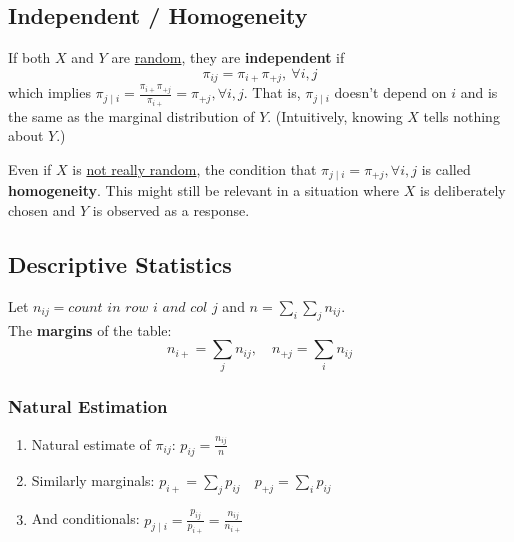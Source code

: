 \documentclass[11pt]{elegantbook}
\begin{document}
\subsection{Independent / Homogeneity}
\begin{definition}[independent]
    If both $X$ and $Y$ are \underline{random}, they are \textbf{independent} if $$\pi_{ij}=\pi_{i+}\pi_{+j},\ \forall i,j$$
    which implies $\pi_{j\mid i}=\frac{\pi_{i+}\pi_{+j}}{\pi_{i+}}=\pi_{+j},\forall i,j$. That is, $\pi_{j\mid i}$ doesn't depend on $i$ and is the same as the marginal distribution of $Y$. (Intuitively, knowing $X$ tells nothing about $Y$.)
\end{definition}
\begin{definition}[homogeneity]
    Even if $X$ is \underline{not really random}, the condition that $\pi_{j\mid i}=\pi_{+j},\forall i,j$ is called \textbf{homogeneity}. This might still be relevant in a situation where $X$ is deliberately chosen and $Y$ is observed as a response.
\end{definition}

\subsection{Descriptive Statistics}
Let $n_{ij}=\textit{count in row $i$ and col $j$}$ and $n=\sum_i\sum_jn_{ij}$.\\
The \textbf{margins} of the table:
$$n_{i+}=\sum_jn_{ij},\quad n_{+j}=\sum_in_{ij}$$
\subsubsection*{Natural Estimation}
\begin{enumerate}
    \item Natural estimate of $\pi_{ij}$: $p_{ij}=\frac{n_{ij}}{n}$
    \item Similarly marginals: $p_{i+}=\sum_j p_{ij}\quad p_{+j}=\sum_i p_{ij}$
    \item And conditionals: $p_{j\mid i}=\frac{p_{ij}}{p_{i+}}=\frac{n_{ij}}{n_{i+}}$
\end{enumerate}
\end{document}

